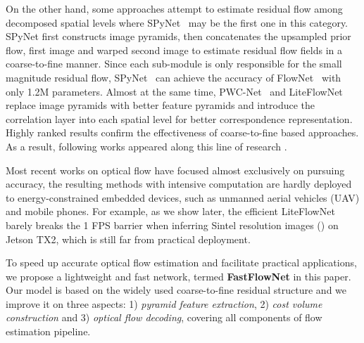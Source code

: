 \documentclass[letterpaper, 10 pt, conference]{ieeeconf}
\begin{document}
On the other hand, some approaches attempt 
to estimate residual flow among decomposed spatial levels where SPyNet~\cite{Ranjan_2017} 
may be the first one  in this category.
SPyNet  first constructs image pyramids, then concatenates the upsampled prior flow, first image and warped second image to estimate residual flow fields in a coarse-to-fine manner. Since each sub-module is only responsible for the small magnitude residual flow, SPyNet~\cite{Ranjan_2017} can achieve the 
accuracy of FlowNet~\cite{Fischer_2015} with only 1.2M parameters. 
Almost at the same time, PWC-Net~\cite{Sun_2018_CVPR} and LiteFlowNet~\cite{Hui_2018_CVPR} replace image pyramids  with better feature pyramids  and introduce the correlation layer into each spatial level for better correspondence representation. Highly ranked results confirm the effectiveness of coarse-to-fine based approaches.
As a result, following works appeared along this line of research \cite{Hur_2019, Yin_2019, zhao2020maskflownet, Kong_2020, hofinger2019improving}.





Most recent works on optical flow \cite{zhao2020maskflownet, hofinger2019improving, teed2020raft} have focused almost exclusively on pursuing accuracy, the resulting methods with intensive computation  are hardly deployed to 
energy-constrained embedded devices, such as unmanned aerial vehicles (UAV)
and mobile phones.
For example, as we 
show later, 
the efficient LiteFlowNet~\cite{Hui_2018_CVPR} barely breaks the 1 FPS barrier when inferring Sintel resolution images () on Jetson TX2, which is still far from practical deployment.




To speed up accurate optical flow estimation and facilitate practical applications, we propose a lightweight and fast network,
termed 
\textbf{FastFlowNet} in this paper. Our model is based on the widely used coarse-to-fine residual structure and we improve it on three aspects: 1) 
\textit{pyramid feature extraction}, 2) \textit{cost volume construction} and 3) \textit{optical flow decoding}, covering all components of flow estimation pipeline. 
\end{document}
